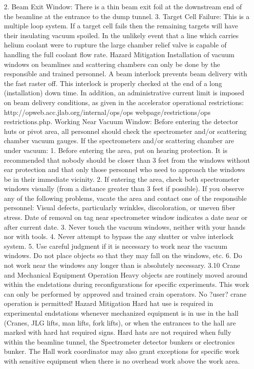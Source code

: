 {{{	2.  	Beam Exit Window: There is a thin beam exit foil at the downstream end of the beamline at the entrance to the dump tunnel.
	3. 	Target Cell Failure: This is a multiple loop system. If a target cell fails then the remaining targets will have their insulating vacuum spoiled. In the unlikely event that a line which carries helium coolant were to rupture the large chamber relief valve is capable of handling the full coolant flow rate.
Hazard Mitigation	
	Installation of vacuum windows on beamlines and scattering chambers can only be done by the responsible and trained personnel. A beam interlock prevents beam delivery with the fast raster off. This interlock is properly checked at the end of a long (installation) down time. In addition, an administrative current limit is imposed on beam delivery conditions, as given in the accelerator operational restrictions: http://opweb.acc.jlab.org/internal/ops/ops webpage/restrictions/ops restrictions.php.
	Working Near Vacuum Window: Before entering the detector huts or pivot area, all personnel should check the spectrometer and/or scattering chamber vacuum gauges. If the spectrometers and/or scattering chamber are under vacuum:
	1. 	Before entering the area, put on hearing protection. It is recommended that nobody should be closer than 3 feet from the windows without ear protection and that only those personnel who need to approach the windows be in their immediate vicinity.
	2. 	If entering the area, check both spectrometer windows visually (from a distance greater than 3 feet if possible). If you observe any of the following problems, vacate the area and contact one of the responsible personnel: Visual defects, particularly wrinkles, discoloration, or uneven fiber stress. Date of removal on tag near spectrometer window indicates a date near or after current date.
	3. 	Never touch the vacuum windows, neither with your hands nor with tools.
	4. 	Never attempt to bypass the any shutter or valve interlock system.
	5. 	Use careful judgment if it is necessary to work near the vacuum windows. Do not place objects so that they may fall on the windows, etc.
	6.	 Do not work near the windows any longer than is absolutely necessary.
3.10 	Crane and Mechanical Equipment Operation
	Heavy objects are routinely moved around within the endstations during reconfigurations for specific experiments. This work can only be performed by approved and trained crain operators. No ?user? crane operation is permitted!
Hazard Mitigation
	Hard hat use is required in experimental endstations whenever mechanized equipment is in use in the hall (Cranes, JLG lifts, man lifts, fork lifts), or when the entrances to the hall are marked with hard hat required signs. Hard hats are not required when fully within the beamline tunnel, the Spectrometer detector bunkers or electronics bunker. The Hall work coordinator may also grant exceptions for specific work with sensitive equipment when there is no overhead work above the work area.
}}}
